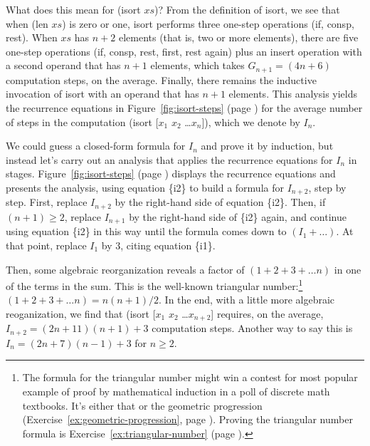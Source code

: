 What does this mean for \textsf{(isort $xs$)}?
From the definition of \textsf{isort},
we see that when \textsf{(len $xs$)} is zero or one,
\textsf{isort} performs three one-step operations
(\textsf{if}, \textsf{consp}, \textsf{rest}).
When $xs$ has $n+2$ elements (that is, two or more elements),
there are five one-step operations
(\textsf{if}, \textsf{consp},
\textsf{rest}, \textsf{first}, \textsf{rest} again)
plus an \textsf{insert} operation
with a second operand that has $n+1$ elements,
which takes $G_{n+1} = (4n+6)$ computation steps, on the average.
Finally, there remains the inductive invocation of \textsf{isort}
with an operand that has $n+1$ elements.
This analysis yields the recurrence equations
in Figure~\ref{fig:isort-steps} (page \pageref{fig:isort-steps})
for the average number of steps in the computation
\textsf{(isort [$x_1$ $x_2$ \dots $x_{n}$])}, which we denote by $I_n$.

We could guess a closed-form formula for $I_n$ and prove it by induction,
but instead let's carry out an analysis that applies
the recurrence equations for $I_n$ in stages.
Figure~\ref{fig:isort-steps} (page \pageref{fig:isort-steps})
displays the recurrence equations and presents the analysis,
using equation \{i2\} to build a formula for $I_{n+2}$, step by step.
First, replace $I_{n+2}$ by the right-hand side of equation \{i2\}.
Then, if $(n+1)\geq 2$, replace $I_{n+1}$ by the right-hand side of \{i2\} again,
and continue using equation \{i2\} in this way until
the formula comes down to $(I_1 + \dots)$.
At that point, replace $I_1$ by $3$, citing equation \{i1\}.

Then, some algebraic reorganization reveals a factor
of $(1 + 2 + 3 + \dots n)$ in one of the terms in the sum.
This is the well-known
triangular number:\footnote{The formula for the triangular number
might win a contest for most popular example of proof by mathematical induction
in a poll of discrete math textbooks. It's either that or the
geometric progression (Exercise~\ref{ex:geometric-progression}, page \pageref{ex:geometric-progression}).
Proving the triangular number formula is Exercise~\ref{ex:triangular-number} (page \pageref{ex:triangular-number}).}
$(1 + 2 + 3 + \dots n) = n(n+1)/2$.
In the end, with a little more algebraic reoganization,
we find that \textsf{(isort [$x_1$ $x_2$ \dots $x_{n+2}$]} requires,
on the average,
$I_{n+2} = (2n+11)(n+1) + 3$ computation steps.
Another way to say this is
$I_{n} = (2n+7)(n-1) + 3$ for $n\geq 2$.

